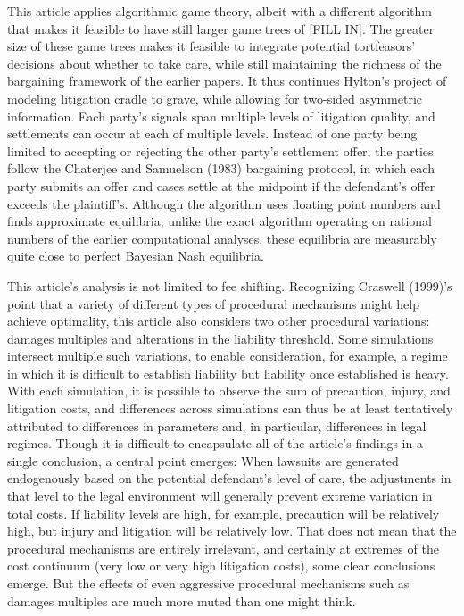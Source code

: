 \documentclass{article}
\begin{document}
This article applies algorithmic game theory, albeit with a different algorithm that makes it feasible to have still larger game trees of [FILL IN]. The greater size of these game trees makes it feasible to integrate potential tortfeasors' decisions about whether to take care, while still maintaining the richness of the bargaining framework of the earlier papers. It thus continues Hylton's project of modeling litigation cradle to grave, while allowing for two-sided asymmetric information. Each party's signals span multiple levels of litigation quality, and settlements can occur at each of multiple levels. Instead of one party being limited to accepting or rejecting the other party's settlement offer, the parties follow the Chaterjee and Samuelson (1983) bargaining protocol, in which each party submits an offer and cases settle at the midpoint if the defendant's offer exceeds the plaintiff's. Although the algorithm uses floating point numbers and finds approximate equilibria, unlike the exact algorithm operating on rational numbers of the earlier computational analyses, these equilibria are measurably quite close to perfect Bayesian Nash equilibria. 

This article's analysis is not limited to fee shifting. Recognizing Craswell (1999)'s point that a variety of different types of procedural mechanisms might help achieve optimality, this article also considers two other procedural variations: damages multiples and alterations in the liability threshold. Some simulations intersect multiple such variations, to enable consideration, for example, a regime in which it is difficult to establish liability but liability once established is heavy. With each simulation, it is possible to observe the sum of precaution, injury, and litigation costs, and differences across simulations can thus be at least tentatively attributed to differences in parameters and, in particular, differences in legal regimes. Though it is difficult to encapsulate all of the article's findings in a single conclusion, a central point emerges: When lawsuits are generated endogenously based on the potential defendant's level of care, the adjustments in that level to the legal environment will generally prevent extreme variation in total costs. If liability levels are high, for example, precaution will be relatively high, but injury and litigation will be relatively low. That does not mean that the procedural mechanisms are entirely irrelevant, and certainly at extremes of the cost continuum (very low or very high litigation costs), some clear conclusions emerge. But the effects of even aggressive procedural mechanisms such as damages multiples are much more muted than one might think. 
\end{document}
